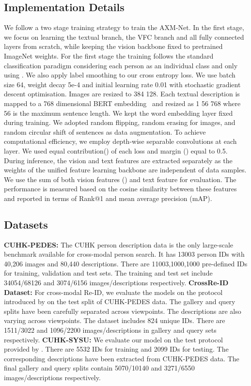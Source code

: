 \documentclass[letterpaper]{article} \usepackage{aaai22}  \usepackage{times}  \usepackage{helvet}  \usepackage{courier}  \usepackage[hyphens]{url}  \usepackage{graphicx} \urlstyle{rm} \def\UrlFont{\rm}  \usepackage{natbib}  \usepackage{caption} \DeclareCaptionStyle{ruled}{labelfont=normalfont,labelsep=colon,strut=off} \frenchspacing  \setlength{\pdfpagewidth}{8.5in}  \setlength{\pdfpageheight}{11in}  \usepackage{algorithm}
\begin{document}
\subsection{Implementation Details}
We follow a two stage training strategy to train the AXM-Net. In the first stage, we focus on learning the textual branch, the VFC branch and all fully connected layers from scratch, while keeping the vision backbone fixed to pretrained ImageNet weights. For the first stage the training follows the standard classification paradigm considering each person as an individual class and only using . We also apply label smoothing to our cross entropy loss. We use batch size 64, weight decay 5e-4 and initial learning rate 0.01 with stochastic gradient descent optimisation. Images are resized to 384  128. Each textual description is mapped to a 768 dimensional BERT embedding~\cite{devlin2018bert} and resized as 1  56  768 where 56 is the maximum sentence length. We kept the word embedding layer fixed during training.
We adopted random flipping, random erasing for images, and random circular shift of sentences as data augmentation. To achieve computational efficiency, we employ depth-wise separable convolutions at each layer. We used equal contribution() of each loss and margin () equal to 0.5.
During inference, the vision and text features are extracted separately as the weights of the unified feature learning backbone are independent of data samples. We use the sum of both vision features () and text feature for evaluation. The performance is measured based on the cosine similarity between these features and reported in terms of Rank@1 and mean average precision ({m}AP).

\subsection{Datasets}
\noindent\textbf{CUHK-PEDES:}
The CUHK person description data \cite{li2017person} is the only large-scale benchmark available for cross-modal person search. It has 13003 person IDs with 40,206 images and 80,440 descriptions. There are 11003,1000,1000 pre-defined IDs for training, validation and test sets. The training and test set include 34054/68126 and 3074/6156 images/descriptions respectively. 
\noindent\textbf{CrossRe-ID Dataset:}
For cross-modal Re-ID, we evaluate the models on the protocol introduced by \cite{farooq2020IJCB} on the test split of CUHK-PEDES data. The gallery and query splits have been carefully separated across viewpoints. The descriptions are also varying across viewpoints. The dataset includes 824 unique IDs. There are 1511/3022 and 1096/2200 images/descriptions in gallery and query sets respectively. 
\noindent\textbf{CUHK-SYSU:}
We evaluate our model on the test protocol provided by \cite{farooq2020convolutional}. 
There are 5532 IDs for training and 2099 IDs for testing. The corresponding descriptions have been extracted from CUHK-PEDES data. The final gallery and query splits contain 5070/10140 and 3271/6550 images/descriptions respectively.
\end{document}
